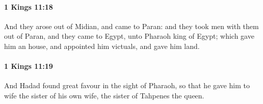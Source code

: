 		\paragraph{1 Kings 11:18} %
			\label{1KINGS-11-18}

			And they arose out of Midian, and came to Paran: and they took men with them out of Paran, and they came to Egypt, unto Pharaoh king of Egypt; which gave him an house, and appointed him victuals, and gave him land.


		\paragraph{1 Kings 11:19} %
			\label{1KINGS-11-19}

			And Hadad found great favour in the sight of Pharaoh, so that he gave him to wife the sister of his own wife, the sister of Tahpenes the queen.


